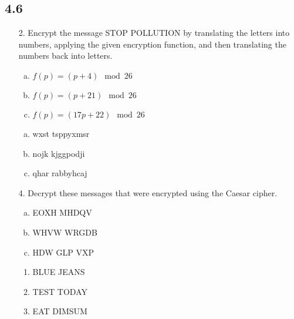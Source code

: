\subsection{4.6}
\begin{itemize}
    \item[2.] Encrypt the message STOP POLLUTION by translating the letters into numbers, applying the given encryption function, and then translating the numbers back into letters.
          \begin{enumerate}[a.]
              \item $f (p) = (p + 4) \mod 26$
              \item $f (p) = (p + 21) \mod 26$
              \item $f (p) = (17p + 22) \mod 26$
          \end{enumerate}
          \answer
          \begin{enumerate}[a.]
              \item wxst tsppyxmsr
              \item nojk kjggpodji
              \item qhar rabbyhcaj
          \end{enumerate}
    \item[4.] Decrypt these messages that were encrypted using the Caesar cipher.
          \begin{enumerate}[a.]
              \item EOXH MHDQV
              \item WHVW WRGDB
              \item HDW GLP VXP
          \end{enumerate}
          \answer
          \begin{enumerate}
              \item BLUE JEANS
              \item TEST TODAY
              \item EAT DIMSUM
          \end{enumerate}



\end{itemize}